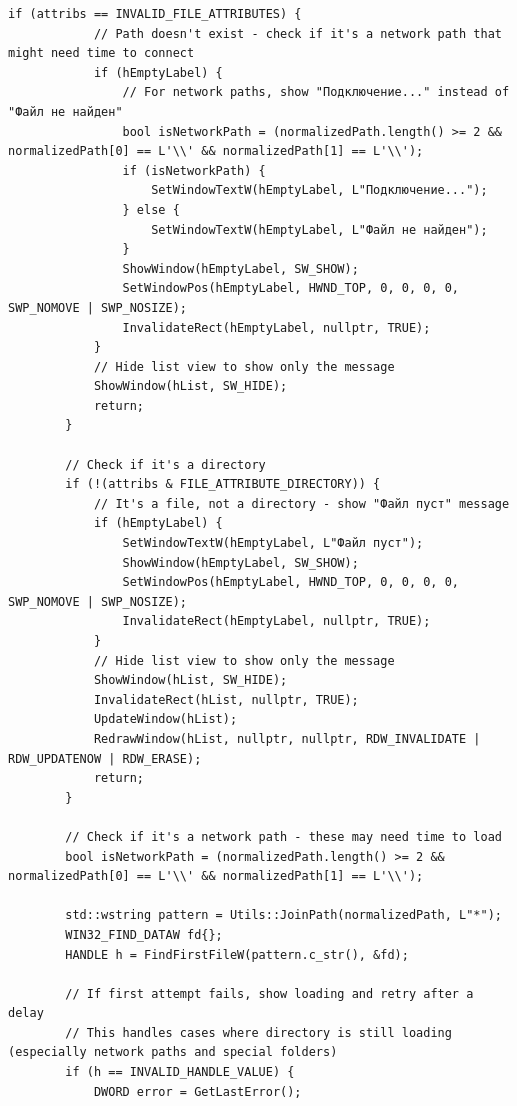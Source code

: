 \begin{lstlisting}[style=CodeListing]
        if (attribs == INVALID_FILE_ATTRIBUTES) {
            // Path doesn't exist - check if it's a network path that might need time to connect
            if (hEmptyLabel) {
                // For network paths, show "Подключение..." instead of "Файл не найден"
                bool isNetworkPath = (normalizedPath.length() >= 2 && normalizedPath[0] == L'\\' && normalizedPath[1] == L'\\');
                if (isNetworkPath) {
                    SetWindowTextW(hEmptyLabel, L"Подключение...");
                } else {
                    SetWindowTextW(hEmptyLabel, L"Файл не найден");
                }
                ShowWindow(hEmptyLabel, SW_SHOW);
                SetWindowPos(hEmptyLabel, HWND_TOP, 0, 0, 0, 0, SWP_NOMOVE | SWP_NOSIZE);
                InvalidateRect(hEmptyLabel, nullptr, TRUE);
            }
            // Hide list view to show only the message
            ShowWindow(hList, SW_HIDE);
            return;
        }
        
        // Check if it's a directory
        if (!(attribs & FILE_ATTRIBUTE_DIRECTORY)) {
            // It's a file, not a directory - show "Файл пуст" message
            if (hEmptyLabel) {
                SetWindowTextW(hEmptyLabel, L"Файл пуст");
                ShowWindow(hEmptyLabel, SW_SHOW);
                SetWindowPos(hEmptyLabel, HWND_TOP, 0, 0, 0, 0, SWP_NOMOVE | SWP_NOSIZE);
                InvalidateRect(hEmptyLabel, nullptr, TRUE);
            }
            // Hide list view to show only the message
            ShowWindow(hList, SW_HIDE);
            InvalidateRect(hList, nullptr, TRUE);
            UpdateWindow(hList);
            RedrawWindow(hList, nullptr, nullptr, RDW_INVALIDATE | RDW_UPDATENOW | RDW_ERASE);
            return;
        }

        // Check if it's a network path - these may need time to load
        bool isNetworkPath = (normalizedPath.length() >= 2 && normalizedPath[0] == L'\\' && normalizedPath[1] == L'\\');
        
        std::wstring pattern = Utils::JoinPath(normalizedPath, L"*");
        WIN32_FIND_DATAW fd{};
        HANDLE h = FindFirstFileW(pattern.c_str(), &fd);
        
        // If first attempt fails, show loading and retry after a delay
        // This handles cases where directory is still loading (especially network paths and special folders)
        if (h == INVALID_HANDLE_VALUE) {
            DWORD error = GetLastError();
            

\end{lstlisting}
